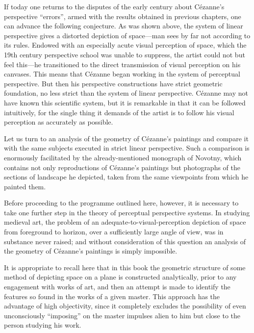 If today one returns to the disputes of the early century about Cézanne's perspective
``errors'', armed with the results obtained in previous chapters, one can advance the
following conjecture. As was shown above, the system of linear perspective gives a
distorted depiction of space---man sees by far not according to its rules. Endowed
with an especially acute visual perception of space, which the 19th century
perspective school was unable to suppress, the artist could not but feel this---he
transitioned to the direct transmission of visual perception on his canvases. This
means that Cézanne began working in the system of perceptual perspective. But then
his perspective constructions have strict geometric foundation, no less strict than
the system of linear perspective. Cézanne may not have known this scientific system,
but it is remarkable in that it can be followed intuitively, for the single thing it
demands of the artist is to follow his visual perception as accurately as possible.

Let us turn to an analysis of the geometry of Cézanne's paintings and compare it
with the same subjects executed in strict linear perspective. Such a comparison is
enormously facilitated by the already-mentioned monograph of Novotny, which
contains not only reproductions of Cézanne's paintings but photographs of the
sections of landscape he depicted, taken from the same viewpoints from which he
painted them.


Before proceeding to the programme outlined here, however, it is necessary to take
one further step in the theory of perceptual perspective systems. In studying
medieval art, the problem of an adequate-to-visual-perception depiction of space
from foreground to horizon, over a sufficiently large angle of view, was in
substance never raised; and without consideration of this question an analysis of
the geometry of Cézanne's paintings is simply impossible.

It is appropriate to recall here that in this book the geometric structure of some
method of depicting space on a plane is constructed analytically, prior to any
engagement with works of art, and then an attempt is made to identify the features
so found in the works of a given master. This approach has the advantage of high
objectivity, since it completely excludes the possibility of even unconsciously
``imposing'' on the master impulses alien to him but close to the person studying
his work.

